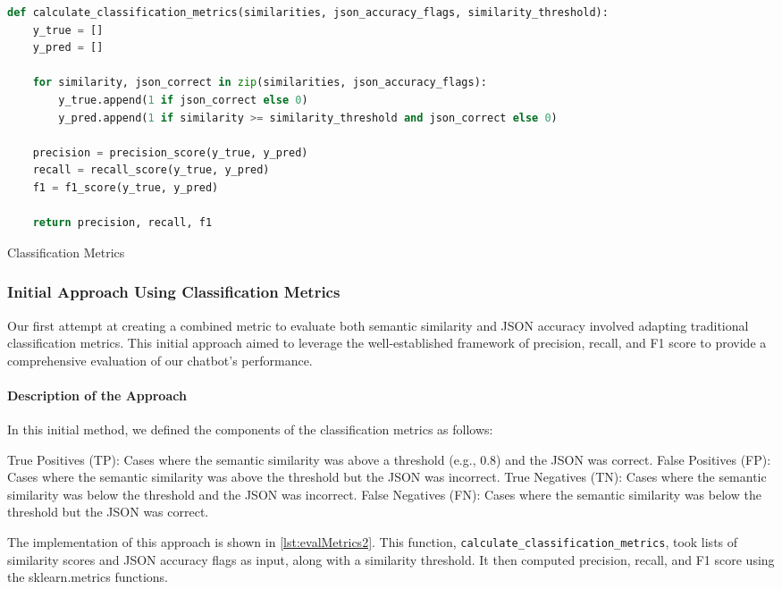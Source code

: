 \begin{Listing}
    \begin{lstlisting}[language=Python]
def calculate_classification_metrics(similarities, json_accuracy_flags, similarity_threshold):
    y_true = []
    y_pred = []

    for similarity, json_correct in zip(similarities, json_accuracy_flags):
        y_true.append(1 if json_correct else 0)
        y_pred.append(1 if similarity >= similarity_threshold and json_correct else 0)

    precision = precision_score(y_true, y_pred)
    recall = recall_score(y_true, y_pred)
    f1 = f1_score(y_true, y_pred)

    return precision, recall, f1
  \end{lstlisting}
    \caption{Classification Metrics}
    \label{lst:evalMetrics2}
\end{Listing}

\subsubsection{Initial Approach Using Classification Metrics}
Our first attempt at creating a combined metric to evaluate both semantic similarity and JSON accuracy involved adapting traditional classification metrics. This initial approach aimed to leverage the well-established framework of precision, recall, and F1 score to provide a comprehensive evaluation of our chatbot's performance.
\paragraph{Description of the Approach}
In this initial method, we defined the components of the classification metrics as follows:

True Positives (TP): Cases where the semantic similarity was above a threshold (e.g., 0.8) and the JSON was correct.
False Positives (FP): Cases where the semantic similarity was above the threshold but the JSON was incorrect.
True Negatives (TN): Cases where the semantic similarity was below the threshold and the JSON was incorrect.
False Negatives (FN): Cases where the semantic similarity was below the threshold but the JSON was correct.

The implementation of this approach is shown in \cref{lst:evalMetrics2}. This function, \texttt{calculate_classification_metrics}, took lists of similarity scores and JSON accuracy flags as input, along with a similarity threshold. It then computed precision, recall, and F1 score using the sklearn.metrics functions.

